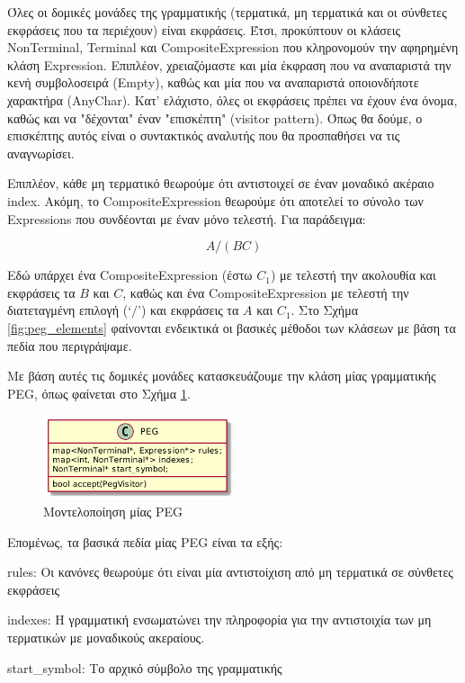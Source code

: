 \documentclass[diploma]{softlab-thesis}
\begin{document}
Όλες οι δομικές μονάδες της γραμματικής (τερματικά, μη τερματικά και οι σύνθετες εκφράσεις που τα περιέχουν) είναι εκφράσεις. 
Έτσι, προκύπτουν οι κλάσεις NonTerminal, Terminal και CompositeExpression που κληρονομούν την αφηρημένη κλάση Expression.
Επιπλέον, χρειαζόμαστε και μία έκφραση που να αναπαριστά την κενή συμβολοσειρά (Empty), καθώς και μία που να αναπαριστά οποιονδήποτε χαρακτήρα (AnyChar).
Κατ' ελάχιστο, όλες οι εκφράσεις πρέπει να έχουν ένα όνομα, καθώς και να "δέχονται" έναν "επισκέπτη" (visitor pattern).
Όπως θα δούμε, ο επισκέπτης αυτός είναι ο συντακτικός αναλυτής που θα προσπαθήσει να τις αναγνωρίσει.

Επιπλέον, κάθε μη τερματικό θεωρούμε ότι αντιστοιχεί σε έναν μοναδικό ακέραιο index. 
Ακόμη, το CompositeExpression θεωρούμε ότι αποτελεί το σύνολο των Expressions που συνδέονται με έναν μόνο τελεστή. 
Για παράδειγμα:

\begin{equation}
	A / (B C)
\end{equation}

Εδώ υπάρχει ένα CompositeExpression (έστω $C_1$) με τελεστή την ακολουθία και εκφράσεις τα $B$ και $C$, καθώς και ένα CompositeExpression με τελεστή την διατεταγμένη επιλογή (`$/$') και εκφράσεις τα $A$ και $C_1$. 
Στο Σχήμα \ref{fig:peg_elements} φαίνονται ενδεικτικά οι βασικές μέθοδοι των κλάσεων με βάση τα πεδία που περιγράψαμε.

Με βάση αυτές τις δομικές μονάδες κατασκευάζουμε την κλάση μίας γραμματικής PEG, όπως φαίνεται στο Σχήμα \ref{fig:peg}.

\begin{figure}[h]
    \centering
	\includegraphics[width=0.50\textwidth]{uml/peg}
	\caption{Μοντελοποίηση μίας PEG}
    \label{fig:peg}
\end{figure}

\begin{minipage}{\textwidth}

Επομένως, τα βασικά πεδία μίας PEG είναι τα εξής:

\begin{description}[font=$\bullet$\scshape\bfseries]
	\item rules: Οι κανόνες θεωρούμε ότι είναι μία αντιστοίχιση από μη τερματικά σε σύνθετες εκφράσεις
	\item indexes: Η γραμματική ενσωματώνει την πληροφορία για την αντιστοιχία των μη τερματικών με μοναδικούς ακεραίους.
	\item start\_symbol: Το αρχικό σύμβολο της γραμματικής
\end{description}

\end{minipage}
\end{document}
